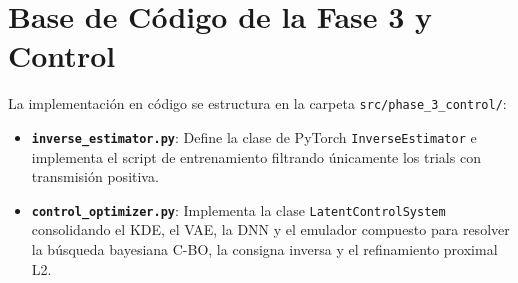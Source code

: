 \documentclass[12pt,letterpaper]{article}
\begin{document}
\begin{table}[H]
    \centering
    \caption{Comparación de voltajes: Trial 104 (Original) vs. Consigna Inversa Reconstruida.}
    \label{tab:comp_voltages}
\end{table}

\section{Base de Código de la Fase 3 y Control}
La implementación en código se estructura en la carpeta \texttt{src/phase\_3\_control/}:
\begin{itemize}
    \item \textbf{\texttt{inverse\_estimator.py}}: Define la clase de PyTorch \texttt{InverseEstimator} e implementa el script de entrenamiento filtrando únicamente los trials con transmisión positiva.
    \item \textbf{\texttt{control\_optimizer.py}}: Implementa la clase \texttt{LatentControlSystem} consolidando el KDE, el VAE, la DNN y el emulador compuesto para resolver la búsqueda bayesiana C-BO, la consigna inversa y el refinamiento proximal L2.
\end{itemize}
\end{document}
